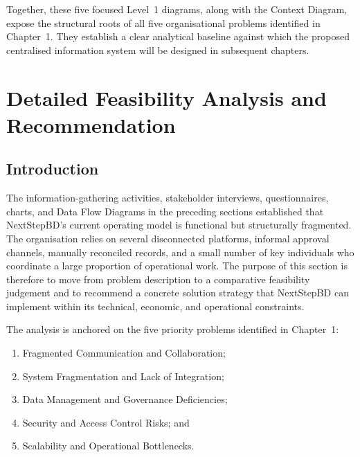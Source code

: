 \documentclass[12pt,a4paper]{report}
\begin{document}
\noindent Together, these five focused Level~1 diagrams, along with the Context Diagram, expose the structural roots of all five organisational problems identified in Chapter~1. They establish a clear analytical baseline against which the proposed centralised information system will be designed in subsequent chapters.



\section{Detailed Feasibility Analysis and Recommendation}
\label{sec:detailed-feasibility-and-recommendation}

\subsection{Introduction}
The information-gathering activities, stakeholder interviews, questionnaires, charts, and Data
Flow Diagrams in the preceding sections established that NextStepBD's current operating model is
functional but structurally fragmented. The organisation relies on several disconnected platforms,
informal approval channels, manually reconciled records, and a small number of key individuals
who coordinate a large proportion of operational work. The purpose of this section is therefore
to move from problem description to a comparative feasibility judgement and to recommend a
concrete solution strategy that NextStepBD can implement within its technical, economic, and
operational constraints.

The analysis is anchored on the five priority problems identified in Chapter~1:
\begin{enumerate}[label=\arabic*., leftmargin=1.8em]
    \item Fragmented Communication and Collaboration;
    \item System Fragmentation and Lack of Integration;
    \item Data Management and Governance Deficiencies;
    \item Security and Access Control Risks; and
    \item Scalability and Operational Bottlenecks.
\end{enumerate}
\end{document}
